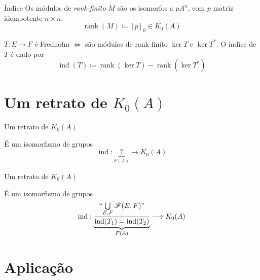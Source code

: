 \documentclass[9pt, compress]{beamer}
\begin{document}
{\begin{frame}{Índice}
    Os módulos de \textit{rank-finito} $M$ são os isomorfos a $pA^n$, com $p$ matriz idempotente $n\times n$.\pause
    \[
    \operatorname{rank}(M) \coloneqq [p]_0  \in K_0(A)  
    \]
    \pause
    \begin{proposicao}
         $T:E\longrightarrow F$ é Fredholm $\Leftrightarrow$ são módulos de rank-finito $\ker T$ e $\ker T^*$. \pause O índice de $T$ é dado por
         \[
         \operatorname{ind}(T) \coloneqq \operatorname{rank}(\ker T) -\operatorname{rank}(\ker T^*)   
         \]
    \end{proposicao}
\end{frame}

\section{Um retrato de \texorpdfstring{$K_0(A)$}{K0(A)}}

\begin{frame}{Um retrato de \texorpdfstring{$K_0(A)$}{K0(A)}}
    \begin{teorema}
        É um isomorfismo de grupos 
        $$\operatorname{ind} : \underbrace{\boxed{\,?\,}}_{F(A)} \longrightarrow K_0(A)$$
    \end{teorema}    
\end{frame}

\begin{frame}{Um retrato de \texorpdfstring{$K_0(A)$}{K0(A)}}
    \begin{teorema}
        É um isomorfismo de grupos 
        $$\operatorname{ind} : \underbrace{\dfrac{``{\bigcup\limits_{E,F} \mathscr F(E,F)}"}{\tiny \operatorname{ind}(T_1)=\operatorname{ind}(T_2)}}_{F(A)} \longrightarrow K_0(A)$$
    \end{teorema}    
\end{frame}

\section{Aplicação}

}
\end{document}
